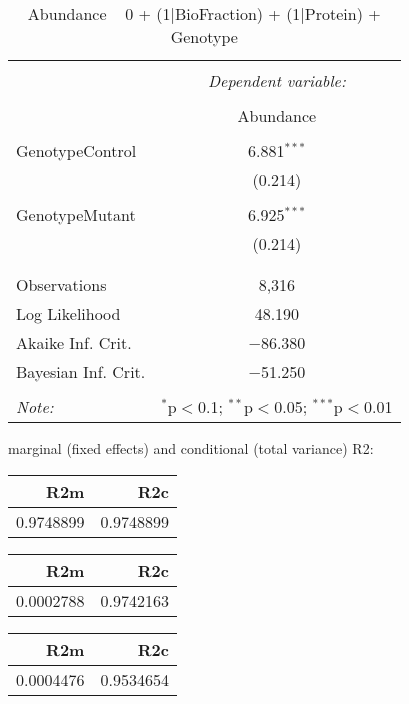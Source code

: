 \documentclass[11pt]{report}
\begin{document}
\begin{table}[!htbp] \centering 
  \caption{Abundance ~ 0 + (1|BioFraction) + (1|Protein) + Genotype} 
  \label{} 
\begin{tabular}{@{\extracolsep{5pt}}lc} 
\\[-1.8ex]\hline 
\hline \\[-1.8ex] 
 & \multicolumn{1}{c}{\textit{Dependent variable:}} \\ 
\cline{2-2} 
\\[-1.8ex] & Abundance \\ 
\hline \\[-1.8ex] 
 GenotypeControl & 6.881$^{***}$ \\ 
  & (0.214) \\ 
  & \\ 
 GenotypeMutant & 6.925$^{***}$ \\ 
  & (0.214) \\ 
  & \\ 
\hline \\[-1.8ex] 
Observations & 8,316 \\ 
Log Likelihood & 48.190 \\ 
Akaike Inf. Crit. & $-$86.380 \\ 
Bayesian Inf. Crit. & $-$51.250 \\ 
\hline 
\hline \\[-1.8ex] 
\textit{Note:}  & \multicolumn{1}{r}{$^{*}$p$<$0.1; $^{**}$p$<$0.05; $^{***}$p$<$0.01} \\ 
\end{tabular} 
\end{table} 
marginal (fixed effects) and conditional (total variance) R2:

\begin{tabular}{r|r}
\hline
R2m & R2c\\
\hline
0.9748899 & 0.9748899\\
\hline
\end{tabular}

\begin{tabular}{r|r}
\hline
R2m & R2c\\
\hline
0.0002788 & 0.9742163\\
\hline
\end{tabular}

\begin{tabular}{r|r}
\hline
R2m & R2c\\
\hline
0.0004476 & 0.9534654\\
\hline
\end{tabular}
\end{document}

